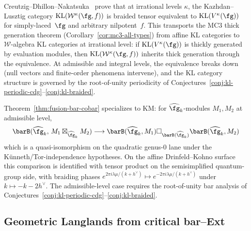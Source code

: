 \begin{remark}
\label{rem:irrational-level-generic}
Creutzig--Dhillon--Nakatsuka~\cite{CDN26} prove that at irrational
levels $\kappa$, the Kazhdan--Lusztig category
$\mathrm{KL}(\mathcal{W}^\kappa(\fg, f))$ is braided tensor equivalent
to $\mathrm{KL}(V^\kappa(\fg))$ for simply-laced~$\fg$ and arbitrary
nilpotent~$f$. This transports the MC3 thick generation theorem
(Corollary~\ref{cor:mc3-all-types}) from affine KL categories to
$\mathcal{W}$-algebra KL categories at irrational level: if
$\mathrm{KL}(V^\kappa(\fg))$ is thickly generated by evaluation
modules, then $\mathrm{KL}(\mathcal{W}^\kappa(\fg, f))$ inherits
thick generation through the equivalence. At admissible and integral
levels, the equivalence breaks down (null vectors and finite-order
phenomena intervene), and the KL category structure is governed by the
root-of-unity periodicity of
Conjectures~\ref{conj:kl-periodic-cdg}--\ref{conj:kl-braided}.
\end{remark}

\begin{remark}
\label{rem:km-fusion-bar-cobar}
Theorem~\ref{thm:fusion-bar-cobar} specializes to KM: for $\widehat{\fg}_k$-modules $M_1, M_2$ at admissible level,
\begin{equation}\label{eq:fusion-bar-cobar}
\barB(\widehat{\fg}_k,\, M_1 \boxtimes_{\widehat{\fg}_k} M_2)
\longrightarrow
\barB(\widehat{\fg}_k, M_1)
\square_{\barB(\widehat{\fg}_k)}
\barB(\widehat{\fg}_k, M_2)
\end{equation}
which is a quasi-isomorphism on the quadratic genus-$0$ lane under the
K\"unneth/Tor-independence hypotheses. On the affine
Drinfeld--Kohno surface this comparison is identified with tensor
product on the semisimplified quantum-group side, with braiding phases
$e^{2\pi i \lambda\mu/(k+h^\vee)} \mapsto
e^{-2\pi i \lambda\mu/(k+h^\vee)}$ under
$k \mapsto -k - 2h^\vee$. The admissible-level case requires the
root-of-unity bar analysis of
Conjectures~\ref{conj:kl-periodic-cdg}--\ref{conj:kl-braided}.
\end{remark}

\subsection{Geometric Langlands from critical bar--Ext}
\label{subsec:geom-langlands-bar}

